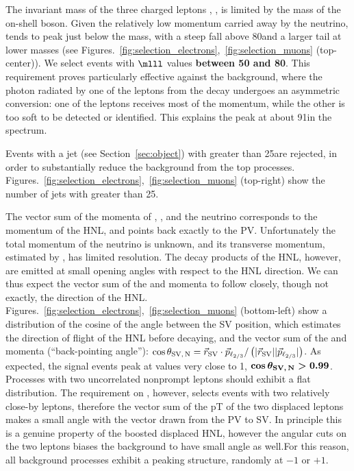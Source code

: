 The invariant mass of the three charged leptons \mlll, \mthreel, is limited
by the mass of the on-shell \PW boson. Given the relatively low
momentum carried away by the neutrino, \mlll tends to peak just
below the \PW mass, with a steep fall above 80\GeV and a larger tail
at lower masses (see Figures.~\ref{fig:selection_electrons},~\ref{fig:selection_muons} (top-center)). We select
events with $\boldsymbol{\mlll}$ values \textbf{between 50 and 80\GeV}. This requirement
proves particularly effective against the \Zgs background, where the
photon radiated by one of the leptons from the \PZ decay undergoes an
asymmetric conversion: one of the leptons receives most of the \PGg
momentum, while the other is too soft to be detected or
identified. This explains the peak at about 91\GeV in the \mthreel
spectrum. 
\vspace{2mm}

Events with a \PQb jet (see Section~\ref{sec:object}) with \pt greater
than 25\GeV are rejected, in order to substantially reduce the
background from the top processes.
Figures.~\ref{fig:selection_electrons},~\ref{fig:selection_muons} (top-right) show the number of \PQb jets with \pt greater than 25\GeV.
\vspace{2mm}

The vector sum of the momenta of \ltwo, \lthree, and the neutrino
corresponds to the momentum of the HNL, and points back exactly to the
PV. Unfortunately the total momentum of the neutrino is unknown, and
its transverse momentum, estimated by \ptmiss, has limited resolution.
The decay products of the HNL, however, are emitted at small opening
angles with respect to the HNL direction. We can thus expect the
vector sum of the \ltwo and \lthree momenta to follow closely, though
not exactly, the direction of the HNL. Figures.~\ref{fig:selection_electrons},~\ref{fig:selection_muons} (bottom-left) show a distribution of the cosine of the angle between the SV
position, which estimates the direction of flight of the HNL before
decaying, and the vector sum of the \ltwo and \lthree momenta
(``back-pointing angle''):
$\cos{\theta_{\mathrm{SV,\,\ensuremath{\mathrm{N}}}}} = \vec{r}_{\mathrm{SV}}\cdot\vec{p}_{\mathrm{\ell_{2/3}}}/
\left(|\vec{r}_{\mathrm{SV}}||\vec{p}_{\mathrm{\ell_{2/3}}}|\right)$.
As expected, the signal events peak at values very close to 1,
$\boldsymbol{\cos{\theta_{\mathrm{SV,\,\ensuremath{\mathrm{N}}}}} > 0.99}$.
Processes with two uncorrelated nonprompt leptons should exhibit a
flat \costheta distribution. The requirement on \DRtwol, however,
selects events with two relatively close-by leptons, therefore the vector sum of the pT of the two displaced leptons makes a small angle with the vector drawn from the PV to SV. In principle this is a genuine property of the boosted displaced HNL, however the angular cuts on the two leptons biases the background to have small angle as well.For this reason, all
background processes exhibit a peaking structure, randomly at $-1$ or
$+1$.
\vspace{2mm}

